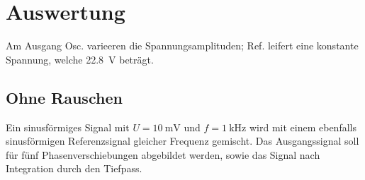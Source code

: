 \section{Auswertung}
\label{sec:Auswertung}
Am Ausgang Osc. varieeren die Spannungsamplituden; Ref. leifert eine konstante Spannung, welche \SI {22,8}{\volt} beträgt.

\subsection{Ohne Rauschen}
Ein sinusförmiges Signal mit $U = \SI{10}{\milli \volt}$ und $f = \SI{1}{\kilo \Hz}$ wird mit einem ebenfalls sinusförmigen Referenzsignal gleicher Frequenz gemischt. Das Ausgangssignal soll für fünf Phasenverschiebungen abgebildet werden, sowie das Signal nach Integration durch den Tiefpass.

